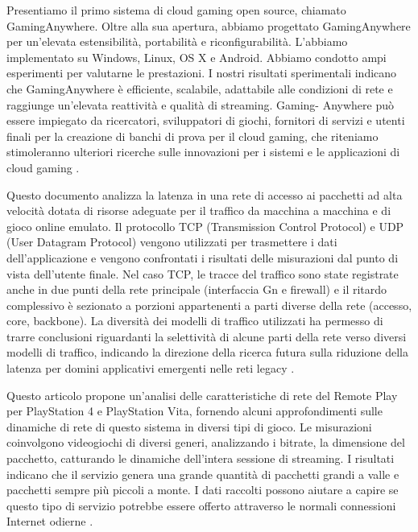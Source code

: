 Presentiamo il primo sistema di cloud gaming open source, chiamato GamingAnywhere. Oltre alla sua apertura, abbiamo progettato GamingAnywhere per un'elevata estensibilità, portabilità e riconfigurabilità. L'abbiamo implementato su Windows, Linux, OS X e Android. Abbiamo condotto ampi esperimenti per valutarne le prestazioni. I nostri risultati sperimentali indicano che GamingAnywhere è efficiente, scalabile, adattabile alle condizioni di rete e raggiunge un'elevata reattività e qualità di streaming. Gaming- Anywhere può essere impiegato da ricercatori, sviluppatori di giochi, fornitori di servizi e utenti finali per la creazione di banchi di prova per il cloud gaming, che riteniamo stimoleranno ulteriori ricerche sulle innovazioni per i sistemi e le applicazioni di cloud gaming \parencite{GamingAnywhere}.

Questo documento analizza la latenza in una rete di accesso ai pacchetti ad alta velocità dotata di risorse adeguate per il traffico da macchina a macchina e di gioco online emulato. Il protocollo TCP (Transmission Control Protocol) e UDP (User Datagram Protocol) vengono utilizzati per trasmettere i dati dell'applicazione e vengono confrontati i risultati delle misurazioni dal punto di vista dell'utente finale. Nel caso TCP, le tracce del traffico sono state registrate anche in due punti della rete principale (interfaccia Gn e firewall) e il ritardo complessivo è sezionato a porzioni appartenenti a parti diverse della rete (accesso, core, backbone). La diversità dei modelli di traffico utilizzati ha permesso di trarre conclusioni riguardanti la selettività di alcune parti della rete verso diversi modelli di traffico, indicando la direzione della ricerca futura sulla riduzione della latenza per domini applicativi emergenti nelle reti legacy \parencite{Latency_analysis_for_M2M}.

Questo articolo propone un'analisi delle caratteristiche di rete del Remote Play per PlayStation 4 e PlayStation Vita, fornendo alcuni approfondimenti sulle dinamiche di rete di questo sistema in diversi tipi di gioco. Le misurazioni coinvolgono videogiochi di diversi generi, analizzando i bitrate, la dimensione del pacchetto, catturando le dinamiche dell'intera sessione di streaming. I risultati indicano che il servizio genera una grande quantità di pacchetti grandi a valle e pacchetti sempre più piccoli a monte. I dati raccolti possono aiutare a capire se questo tipo di servizio potrebbe essere offerto attraverso le normali connessioni Internet odierne \parencite{Network_Analysis_of_the_Sony_Remote_Play_System}.


